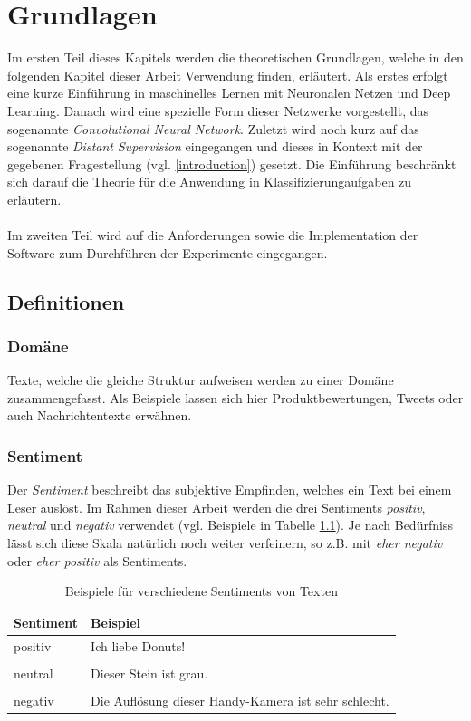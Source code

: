 \chapter{Grundlagen}
Im ersten Teil dieses Kapitels werden die theoretischen Grundlagen, welche in den folgenden Kapitel dieser Arbeit Verwendung finden, erläutert. Als erstes erfolgt eine kurze Einführung in maschinelles Lernen mit Neuronalen Netzen und Deep Learning. Danach wird eine spezielle Form dieser Netzwerke vorgestellt, das sogenannte \emph{Convolutional Neural Network}. Zuletzt wird noch kurz auf das sogenannte \emph{Distant Supervision} \cite{go2009twitter} eingegangen und dieses in Kontext mit der gegebenen Fragestellung (vgl. \ref{introduction}) gesetzt. Die Einführung beschränkt sich darauf die Theorie für die Anwendung in Klassifizierungaufgaben zu erläutern.\\\\
Im zweiten Teil wird auf die Anforderungen sowie die Implementation der Software zum Durchführen der Experimente eingegangen.

\section{Definitionen}

\subsection{Domäne}
Texte, welche die gleiche Struktur aufweisen werden zu einer Domäne zusammengefasst. Als Beispiele lassen sich hier Produktbewertungen, Tweets oder auch Nachrichtentexte erwähnen.

\subsection{Sentiment}
Der \emph{Sentiment} beschreibt das subjektive Empfinden, welches ein Text bei einem Leser auslöst. Im Rahmen dieser Arbeit werden  die drei Sentiments \emph{positiv}, \emph{neutral} und \emph{negativ} verwendet (vgl. Beispiele in Tabelle \ref{basics:sentiments_example_table}). Je nach Bedürfniss lässt sich diese Skala natürlich noch weiter verfeinern, so z.B. mit \emph{eher negativ} oder \emph{eher positiv} als Sentiments.\\
\begin{table}[h]
	\centering
	\begin{tabular}{@{}ll@{}}
		\toprule
		Sentiment & Beispiel\\ \midrule
		positiv & Ich liebe Donuts!\\
		&\\
		neutral & Dieser Stein ist grau.\\
		&\\
		negativ & Die Auflösung dieser Handy-Kamera ist sehr schlecht.\\
		\bottomrule
	\end{tabular}
	\caption{Beispiele für verschiedene Sentiments von Texten}
	\label{basics:sentiments_example_table}
\end{table}

